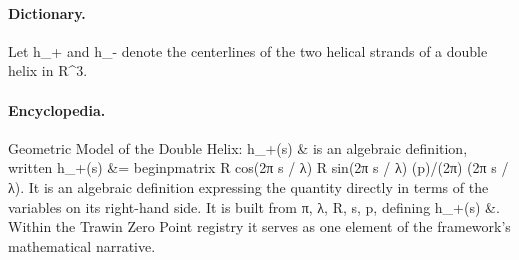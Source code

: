 \paragraph{Dictionary.}
Let h\_+ and h\_- denote the centerlines of the two helical strands of a double helix in R\textasciicircum{}3.

\paragraph{Encyclopedia.}
Geometric Model of the Double Helix: h\_+(s) \& is an algebraic definition, written h\_+(s) \&= beginpmatrix R cos(2π s / λ) R sin(2π s / λ) (p)/(2π) (2π s / λ). It is an algebraic definition expressing the quantity directly in terms of the variables on its right-hand side. It is built from π, λ, R, s, p, defining h\_+(s) \&. Within the Trawin Zero Point registry it serves as one element of the framework's mathematical narrative.
